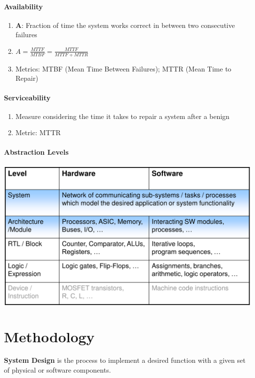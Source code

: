 \documentclass[english]{latex4ei/latex4ei_sheet}
\begin{document}
\paragraph{Availability}
\begin{enumerate}
	\item \textbf{A}: Fraction of time the system works correct in between two consecutive failures
	\item $A = \frac{MTTF}{MTBF} = \frac{MTTF}{MTTF + MTTR}$
	\item Metrics: MTBF (Mean Time Between Failures); MTTR (Mean Time to Repair)
\end{enumerate}

\paragraph{Serviceability}
\begin{enumerate}
	\item Measure considering the time it takes to repair a system after a benign
	\item Metric: MTTR 
\end{enumerate}

\paragraph{Abstraction Levels}

\begin{center}
  \includegraphics[width=0.8\linewidth]{assets/AbstractionLevels.png}
\end{center}


\section{Methodology}

\textbf{System Design} is the process to implement a desired function with a given set of physical or software components.
\end{document}
